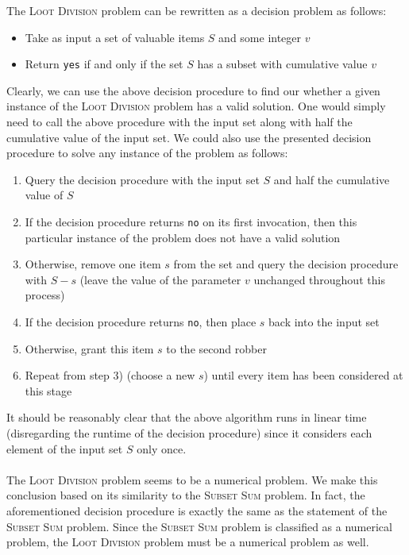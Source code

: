 \documentclass{article}
\begin{document}
The \textsc{Loot Division} problem can be rewritten as a decision problem as follows:
\begin{itemize}
\item Take as input a set of valuable items $S$ and some integer $v$
\item Return \texttt{yes} if and only if the set $S$ has a subset with cumulative value $v$
\end{itemize}
Clearly, we can use the above decision procedure to find our whether a given instance of the \textsc{Loot Division} problem has a valid solution. One would simply need to call the above procedure with the input set along with half the cumulative value of the input set. We could also use the presented decision procedure to solve any instance of the problem as follows:
\begin{enumerate}[1)]
\item Query the decision procedure with the input set $S$ and half the cumulative value of $S$
\item If the decision procedure returns \texttt{no} on its first invocation, then this particular instance of the problem does not have a valid solution
\item Otherwise, remove one item $s$ from the set and query the decision procedure with $S - s$ (leave the value of the parameter $v$ unchanged throughout this process)
\item If the decision procedure returns \texttt{no}, then place $s$ back into the input set
\item Otherwise, grant this item $s$ to the second robber
\item Repeat from step 3) (choose a new $s$) until every item has been considered at this stage
\end{enumerate}
It should be reasonably clear that the above algorithm runs in linear time (disregarding the runtime of the decision procedure) since it considers each element of the input set $S$ only once. \\ \\

The \textsc{Loot Division} problem seems to be a numerical problem. We make this conclusion based on its similarity to the \textsc{Subset Sum} problem. In fact, the aforementioned decision procedure is exactly the same as the statement of the \textsc{Subset Sum} problem. Since the \textsc{Subset Sum} problem is classified as a numerical problem, the \textsc{Loot Division} problem must be a numerical problem as well. \\ \\
\end{document}
